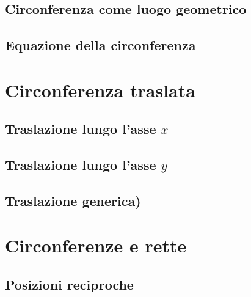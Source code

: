 \begin{center}
 \sum \nexists
\end{center}


\subsection{Circonferenza come luogo geometrico}
\label{subsec:circ_luogo}

\subsection{Equazione della circonferenza}
\label{subsec:circ_equazione}

% 

\section{Circonferenza traslata}
\label{sec:circ_circtraslata}

\subsection{Traslazione lungo l'asse \(x\)}
\label{subsec:circ_traslazionex}

\subsection{Traslazione lungo l'asse \(y\)}
\label{subsec:circ_traslazioney}

\subsection{Traslazione generica)}
\label{subsec:circ_traslazione}

\section{Circonferenze e rette}
\label{sec:circ_circrette}

\subsection{Posizioni reciproche}
\label{subsec:circ_equazione}

